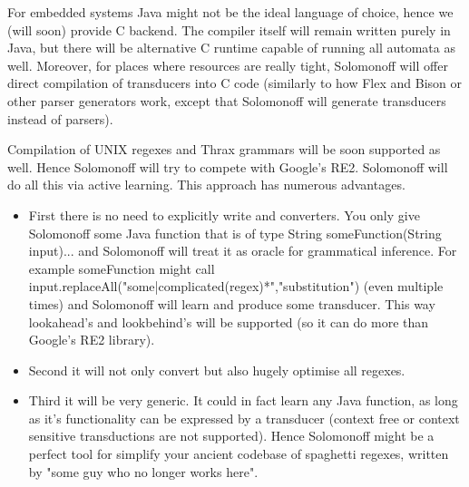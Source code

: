 For embedded systems Java might not be the ideal language of choice, hence we (will soon) provide C backend. The compiler itself will remain written purely in Java, but there will be alternative C runtime capable of running all automata as well. Moreover, for places where resources are really tight, Solomonoff will offer direct compilation of transducers into C code (similarly to how Flex and Bison or other parser generators work, except that Solomonoff will generate transducers instead of parsers).


Compilation of UNIX regexes and Thrax grammars will be soon supported as well. Hence Solomonoff will try to compete with Google's RE2. Solomonoff will do all this via active learning. This approach has numerous advantages.

\begin{itemize}
	\item First there is no need to explicitly write and converters. You only give Solomonoff some Java function that is of type String someFunction(String input){...} and Solomonoff will treat it as oracle for grammatical inference. For example someFunction might call input.replaceAll("some|complicated(regex)*","substitution") (even multiple times) and Solomonoff will learn and produce some transducer. This way lookahead's and lookbehind's will be supported (so it can do more than Google's RE2 library).
	
	\item Second it will not only convert but also hugely optimise all regexes.
	
	\item Third it will be very generic. It could in fact learn any Java function, as long as it's functionality can be expressed by a transducer (context free or context sensitive transductions are not supported). Hence Solomonoff might be a perfect tool for simplify your ancient codebase of spaghetti regexes, written by "some guy who no longer works here".
	
\end{itemize}